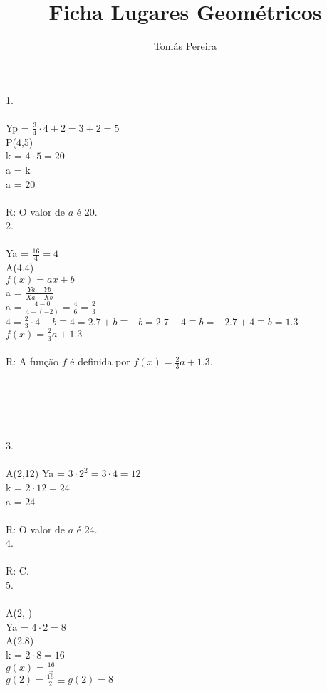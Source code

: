 \documentclass[12pt]{article}
\title{Ficha Lugares Geométricos}
\author{Tomás Pereira}
\begin{document}
\maketitle

1.\\\\
Yp = $\frac{3}{4}\cdot4+2=3+2=5$\\
P(4,5)\\
k = $4\cdot5=20$\\
a = k\\
a = $20$\\\\
R: O valor de $a$ é 20.\\

2.\\\\
Ya = $\frac{16}{4}=4$\\
A(4,4)\\
$f(x)=ax+b$\\
a = $\frac{Ya-Yb}{Xa-Xb}$\\
a = $\frac{4-0}{4-(-2)}=\frac{4}{6}=\frac{2}{3}$\\
$4=\frac{2}{3}\cdot4+b\equiv4=2.7+b\equiv-b=2.7-4\equiv b=-2.7+4\equiv b=1.3$\\
$f(x)=\frac{2}{3}a+1.3$\\\\
R: A função $f$ é definida por $f(x)=\frac{2}{3}a+1.3$.\\\\\\\\\\\\

3.\\\\
A(2,12)
Ya = $3\cdot2^2=3\cdot4=12$\\
k = $2\cdot12=24$\\
a = $24$\\\\
R: O valor de $a$ é 24.\\

4.\\\\
R: C.\\

5.\\\\
A(2, )\\
Ya = $4\cdot2=8$\\
A(2,8)\\
k = $2\cdot8=16$\\
$g(x)=\frac{16}{x}$\\
$g(2)=\frac{16}{2}\equiv g(2)=8$\\
\end{document}
